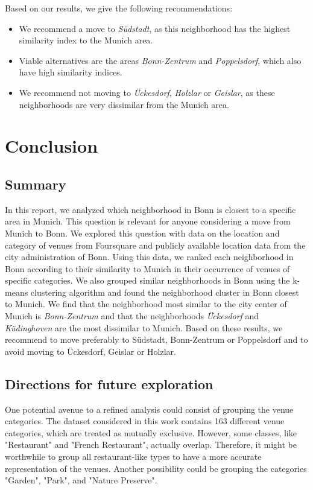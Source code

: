 \documentclass[UKenglish]{scrreprt}
\begin{document}
Based on our results, we give the following recommendations:
\begin{itemize}
	\item We recommend a move to \emph{Südstadt}, as this neighborhood has the highest similarity index to the Munich area.
	\item Viable alternatives are the areas \emph{Bonn-Zentrum} and \emph{Poppelsdorf}, which also have high similarity indices.
	\item We recommend not moving to \emph{Ückesdorf}, \emph{Holzlar} or \emph{Geislar}, as these neighborhoods are very dissimilar from the Munich area.
\end{itemize}


\chapter{Conclusion}
\label{sec:Conclusion}
\section{Summary}
In this report, we analyzed which neighborhood in Bonn is closest to a specific area in Munich. This question is relevant for anyone considering a move from Munich to Bonn. We explored this question with data on the location and category of venues from Foursquare and publicly available location data from the city administration of Bonn. Using this data, we ranked each neighborhood in Bonn according to their similarity to Munich in their occurrence of venues of specific categories. We also grouped similar neighborhoods in Bonn using the k-means clustering algorithm and found the neighborhood cluster in Bonn closest to Munich. We find that the neighborhood most similar to the city center of Munich is \emph{Bonn-Zentrum} and that the neighborhoods \emph{Ückesdorf} and \emph{Küdinghoven} are the most dissimilar to Munich. Based on these results, we recommend to {move preferably to Südstadt, Bonn-Zentrum} or Poppelsdorf and to {avoid moving to Ückesdorf, Geislar or Holzlar}.

\section{Directions for future exploration}
One potential avenue to a refined analysis could consist of grouping the venue categories. The dataset considered in this work contains 163 different venue categories, which are treated as mutually exclusive. However, some classes, like "Restaurant" and "French Restaurant", actually overlap. Therefore, it might be worthwhile to group all restaurant-like types to have a more accurate representation of the venues. Another possibility could be grouping the categories "Garden", "Park", and "Nature Preserve".
\end{document}
